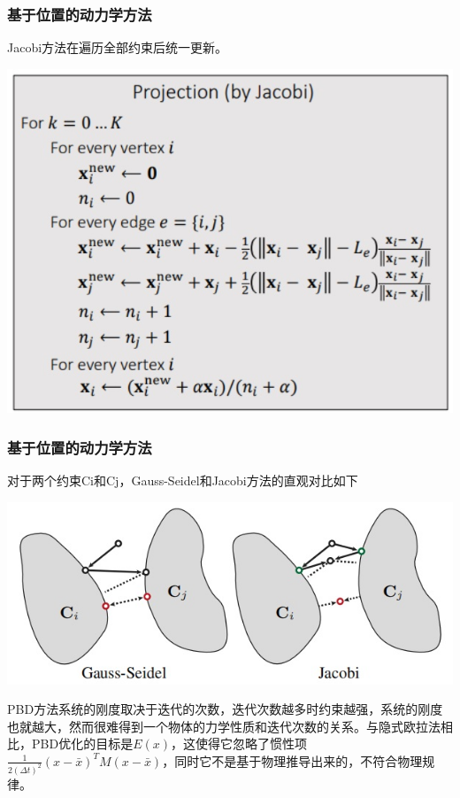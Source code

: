 \documentclass[aspectratio=43]{ctexbeamer}
\begin{document}
\begin{frame}
  \frametitle{基于位置的动力学方法}
		Jacobi方法在遍历全部约束后统一更新。
        \begin{center}
            \includegraphics[width=0.7\linewidth]{./fig/PBD(Jacobi).jpg}
        \end{center}
\end{frame}

\begin{frame}
  \frametitle{基于位置的动力学方法}
		\; \;对于两个约束Ci和Cj，Gauss-Seidel和Jacobi方法的直观对比如下
        \begin{center}
            \includegraphics[width=0.7\linewidth]{./fig/Gauss-Seidel-Jacobi.jpg}
        \end{center}
		\; \;PBD方法系统的刚度取决于迭代的次数，迭代次数越多时约束越强，系统的刚度也就越大，然而很难得到一个物体的力学性质和迭代次数的关系。与隐式欧拉法相比，PBD优化的目标是$E(x)$，这使得它忽略了惯性项$\frac{1}{2(\Delta t)^2}(x-\bar x)^TM(x-\bar x)$，同时它不是基于物理推导出来的，不符合物理规律。
\end{frame}
\end{document}
